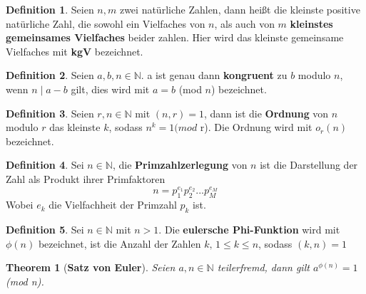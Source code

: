 \documentclass[12pt,oneside]{article}
\newtheorem{theorem}{Theorem}[section]
\theoremstyle{remark}
\theoremstyle{definition}
\newtheorem{definition}{Definition}[section]
\begin{document}
\smallskip

\begin{definition}
Seien $n, m$ zwei natürliche Zahlen, dann heißt die kleinste positive natürliche Zahl, die sowohl ein Vielfaches von $n$, als auch von $m$ \textbf{kleinstes gemeinsames Vielfaches} beider zahlen. Hier wird das kleinste gemeinsame Vielfaches mit \textbf{kgV} bezeichnet.
\end{definition}

\smallskip 

\begin{definition}\label{Df_3}
Seien $a, b, n \in \mathbb{N}$. a ist genau dann \textbf{kongruent} zu $b$ modulo $n$, wenn $n \mid a - b $ gilt, dies wird mit $a = b$ (mod $n$) bezeichnet.  
\end{definition}

\smallskip 

\begin{definition}\label{Df_4}
Seien $r,n \in \mathbb{N}$ mit $(n,r) = 1$, dann ist die \textbf{Ordnung} von $n$ modulo $r$ das kleinste $k$, sodass $n^k = 1 (mod $ r). Die Ordnung wird mit $o_{r}(n)$ bezeichnet.
\end{definition}

\smallskip


\begin{definition}\label{Df_5}
Sei $n \in \mathbb{N}$, die \textbf{Primzahlzerlegung} von $n$ ist die Darstellung der Zahl als Produkt ihrer Primfaktoren \newline
\begin{equation}
    n = p_{1}^{e_{1}}p_{2}^{e_{2}}...p_{M}^{e_{M}}
\end{equation}
Wobei $e_{k}$ die Vielfachheit der Primzahl $p_{k}$ ist.
\end{definition}

\smallskip


\begin{definition}\label{Df_6}
Sei $n \in \mathbb{N}$ mit $n > 1$. Die \textbf{eulersche Phi-Funktion} wird mit $\phi(n)$ bezeichnet, ist die Anzahl der Zahlen $k, \, 1 \leq k \leq n$, sodass $(k,n) = 1$
\end{definition}

\smallskip


\begin{theorem}[\textbf{Satz von Euler}]\label{Th_1}
Seien $a,n \in \mathbb{N}$ teilerfremd, \newline dann gilt $a^{\phi(n)} = 1 $(mod n).
\end{theorem}
\end{document}
